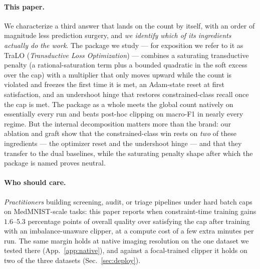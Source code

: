 \documentclass[10pt]{article}
\begin{document}
\paragraph{This paper.} We characterize a third answer that lands on the count
by itself, {with an order of
magnitude less prediction surgery}, and \emph{we identify which of its
ingredients actually do the work}. The package we study --- for exposition we
refer to it as TraLO (\emph{Transductive Loss Optimization}) --- combines a
saturating transductive penalty (a rational-saturation term plus a bounded
quadratic in the soft excess over the cap) with a multiplier that only moves
upward while the count is violated and freezes the first time it is met, an
Adam-state reset at first satisfaction, and an undershoot hinge that restores
constrained-class recall once the cap is met. The package as a whole meets the
{global} count natively on essentially every run
{} and beats post-hoc clipping on macro-F1
in nearly every regime. But the internal decomposition matters more than the
brand: our ablation and graft show that the constrained-class win rests on
\emph{two} of these ingredients --- the optimizer reset and the undershoot
hinge --- and that they transfer to the dual baselines, while the saturating
penalty shape after which the package is named proves neutral.

\paragraph{Who should care.}
\emph{Practitioners} building screening, audit, or triage pipelines under
hard batch caps on MedMNIST-scale tasks: this paper reports when
constraint-time training gains $1.6$--$5.3$ percentage points of overall
quality over satisfying the cap after training{ with an
imbalance-unaware clipper}, at a compute cost of a few
extra minutes per run. 
{The same margin holds at native imaging resolution on the one
dataset we tested there (App.~\ref{app:native}), and against a focal-trained
clipper it holds on two of the three datasets (Sec.~\ref{sec:deploy}).}
\end{document}
